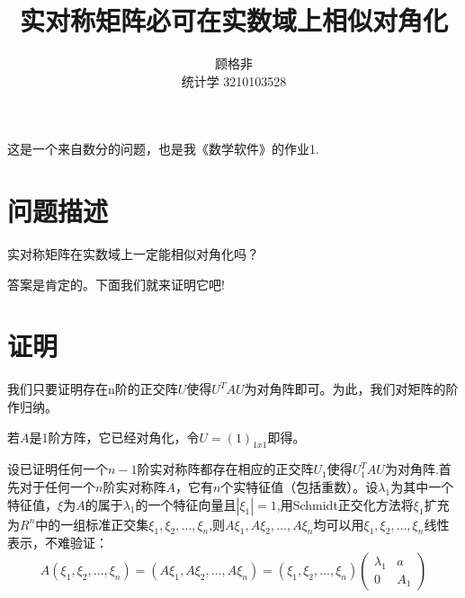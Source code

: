 \documentclass{ctexart}
\title{\vspace{-2cm}实对称矩阵必可在实数域上相似对角化}
\author{顾格非 \\ 统计学 3210103528}
\begin{document}
\maketitle


这是一个来自数分的问题，也是我《数学软件》的作业1.
\section{问题描述}
实对称矩阵在实数域上一定能相似对角化吗？

答案是肯定的。下面我们就来证明它吧!

\section{证明}
我们只要证明存在n阶的正交阵$U$使得$U^TAU$为对角阵即可。为此，我们对矩阵的阶作归纳。

若$A$是1阶方阵，它已经对角化，令$U=(1)_{1x1}$即得。

设已证明任何一个$n-1$阶实对称阵都存在相应的正交阵$U_1$使得$U_1^TAU$为对角阵.首先对于任何一个$n$阶实对称阵$A$，它有$n$个实特征值（包括重数）。设$\lambda_1$为其中一个特征值，$\xi$为$A$的属于$\lambda_1$的一个特征向量且$|\xi_1 | = 1$,用Schmidt正交化方法将$\xi_1$扩充为$R^n$中的一组标准正交集$\xi_1,\xi_2,…,\xi_n$,则$A\xi_1,A\xi_2,…,A\xi_n$均可以用$\xi_1,\xi_2,…,\xi_n$线性表示，不难验证：
\begin{equation}
    A(\xi_1,\xi_2,…,\xi_n)=(A\xi_1,A\xi_2,…,A\xi_n)=(\xi_1,\xi_2,…,\xi_n)\begin{pmatrix}
  \lambda_1 & a\\
  0  & A_1
\end{pmatrix}
\end{equation}
\end{document}
